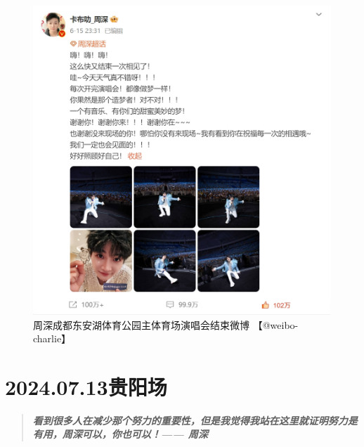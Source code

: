 \documentclass[]{ctexbook}
\begin{document}
\begin{figure}

{\centering \includegraphics{img/weibo/chengdu-20240615} 

}

\caption{周深成都东安湖体育公园主体育场演唱会结束微博 【@weibo-charlie】}\label{fig:unnamed-chunk-49}
\end{figure}

\chapter{2024.07.13贵阳场}\label{guiyang-20240713}

\begin{quote}
\textbf{\emph{看到很多人在减少那个努力的重要性，但是我觉得我站在这里就证明努力是有用，周深可以，你也可以！------ 周深}}
\end{quote}
\end{document}
